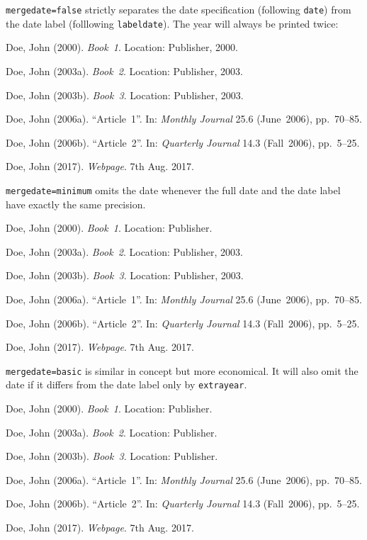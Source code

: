 \documentclass[a4paper]{article}
\newenvironment{bibsample}
  {\trivlist\samepage
   \setlength{\itemsep}{0pt}}
  {\endtrivlist}
\begin{document}
\texttt{mergedate=false} strictly separates the date specification
(following \texttt{date}) from the date label (folllowing \texttt{labeldate}).
The year will always be printed twice:

\begin{bibsample}
\item Doe, John (2000). \emph{Book~1}. Location: Publisher, 2000.
\item Doe, John (2003a). \emph{Book~2}. Location: Publisher, 2003.
\item Doe, John (2003b). \emph{Book~3}. Location: Publisher, 2003.
\item Doe, John (2006a). \enquote{Article~1}. In: \emph{Monthly Journal} 25.6
(June~2006), pp.~70--85.
\item Doe, John (2006b). \enquote{Article~2}. In: \emph{Quarterly Journal} 14.3
(Fall~2006), pp.~5--25.
\item Doe, John (2017). \emph{Webpage}. 7th Aug. 2017.
\end{bibsample}

\texttt{mergedate=minimum} omits the date whenever the full date
and the date label have exactly the same precision.

\begin{bibsample}
\item Doe, John (2000). \emph{Book~1}. Location: Publisher.
\item Doe, John (2003a). \emph{Book~2}. Location: Publisher, 2003.
\item Doe, John (2003b). \emph{Book~3}. Location: Publisher, 2003.
\item Doe, John (2006a). \enquote{Article~1}. In: \emph{Monthly Journal} 25.6
(June~2006), pp.~70--85.
\item Doe, John (2006b). \enquote{Article~2}. In: \emph{Quarterly Journal} 14.3
(Fall~2006), pp.~5--25.
\item Doe, John (2017). \emph{Webpage}. 7th Aug. 2017.
\end{bibsample}

\texttt{mergedate=basic} is similar in concept but more economical.
It will also omit the date if it differs from the date label only by
\texttt{extrayear}.

\begin{bibsample}
\item Doe, John (2000). \emph{Book~1}. Location: Publisher.
\item Doe, John (2003a). \emph{Book~2}. Location: Publisher.
\item Doe, John (2003b). \emph{Book~3}. Location: Publisher.
\item Doe, John (2006a). \enquote{Article~1}. In: \emph{Monthly Journal} 25.6
(June~2006), pp.~70--85.
\item Doe, John (2006b). \enquote{Article~2}. In: \emph{Quarterly Journal} 14.3
(Fall~2006), pp.~5--25.
\item Doe, John (2017). \emph{Webpage}. 7th Aug. 2017.
\end{bibsample}
\end{document}
